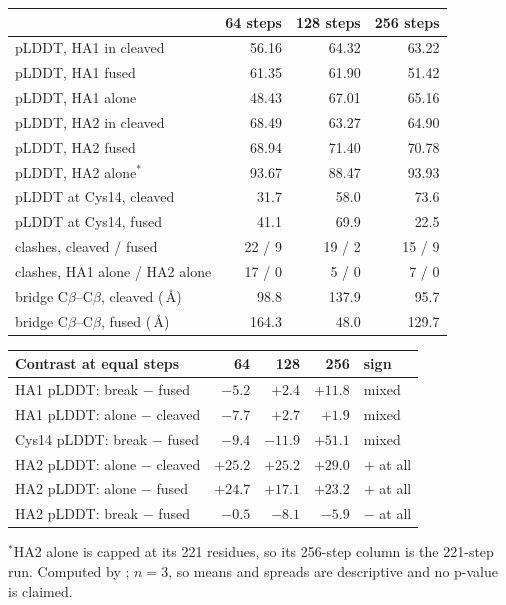 \documentclass[11pt,a4paper]{article}
\newcommand{\ang}{\,\mbox{\AA}}
\begin{document}
\begin{center}
\small
\setlength{\tabcolsep}{6pt}
\begin{tabular}{@{}lrrr@{}}
\toprule
 & 64 steps & 128 steps & 256 steps \\
\midrule
pLDDT, HA1 in cleaved   & 56.16 & 64.32 & 63.22 \\
pLDDT, HA1 fused        & 61.35 & 61.90 & 51.42 \\
pLDDT, HA1 alone        & 48.43 & 67.01 & 65.16 \\
pLDDT, HA2 in cleaved   & 68.49 & 63.27 & 64.90 \\
pLDDT, HA2 fused        & 68.94 & 71.40 & 70.78 \\
pLDDT, HA2 alone$^{*}$  & 93.67 & 88.47 & 93.93 \\
pLDDT at Cys14, cleaved & 31.7 & 58.0 & 73.6 \\
pLDDT at Cys14, fused   & 41.1 & 69.9 & 22.5 \\
clashes, cleaved / fused & 22 / 9 & 19 / 2 & 15 / 9 \\
clashes, HA1 alone / HA2 alone & 17 / 0 & 5 / 0 & 7 / 0 \\
bridge C$\beta$--C$\beta$, cleaved ($\ang$) & 98.8 & 137.9 & 95.7 \\
bridge C$\beta$--C$\beta$, fused ($\ang$)   & 164.3 & 48.0 & 129.7 \\
\bottomrule
\end{tabular}

\smallskip
\begin{tabular}{@{}lrrrl@{}}
\toprule
Contrast at equal steps & 64 & 128 & 256 & sign \\
\midrule
HA1 pLDDT: break $-$ fused  & $-5.2$ & $+2.4$ & $+11.8$ & mixed \\
HA1 pLDDT: alone $-$ cleaved & $-7.7$ & $+2.7$ & $+1.9$ & mixed \\
Cys14 pLDDT: break $-$ fused & $-9.4$ & $-11.9$ & $+51.1$ & mixed \\
HA2 pLDDT: alone $-$ cleaved & $+25.2$ & $+25.2$ & $+29.0$ & $+$ at all \\
HA2 pLDDT: alone $-$ fused   & $+24.7$ & $+17.1$ & $+23.2$ & $+$ at all \\
HA2 pLDDT: break $-$ fused   & $-0.5$ & $-8.1$ & $-5.9$ & $-$ at all \\
\bottomrule
\end{tabular}
\end{center}
\noindent $^{*}$HA2 alone is capped at its 221 residues, so its 256-step
column is the 221-step run. Computed by ;
$n=3$, so means and spreads are descriptive and no p-value is claimed.
\end{document}
